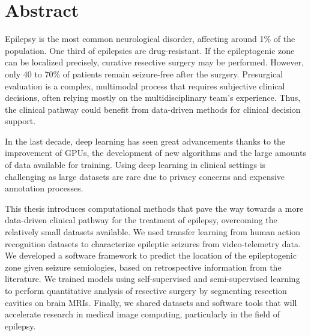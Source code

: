 \chapter{Abstract}


Epilepsy is the most common neurological disorder, affecting around 1\% of the population.
One third of epilepsies are drug-resistant.
If the epileptogenic zone can be localized precisely, curative resective surgery may be performed.
However, only 40 to 70\% of patients remain seizure-free after the surgery.
Presurgical evaluation is a complex, multimodal process that requires subjective clinical decisions, often relying mostly on the multidisciplinary team's experience.
Thus, the clinical pathway could benefit from data-driven methods for clinical decision support.

In the last decade, deep learning has seen great advancements thanks to the improvement of \acp{GPU}, the development of new algorithms and the large amounts of data available for training.
Using deep learning in clinical settings is challenging as large datasets are rare due to privacy concerns and expensive annotation processes.

This thesis introduces computational methods that pave the way towards a more data-driven clinical pathway for the treatment of epilepsy, overcoming the relatively small datasets available.
We used transfer learning from human action recognition datasets to characterize epileptic seizures from video-telemetry data.
We developed a software framework to predict the location of the epileptogenic zone given seizure semiologies, based on retrospective information from the literature.
We trained models using self-supervised and semi-supervised learning to perform quantitative analysis of resective surgery by segmenting resection cavities on brain \acp{MRI}.
Finally, we shared datasets and software tools that will accelerate research in medical image computing, particularly in the field of epilepsy.
